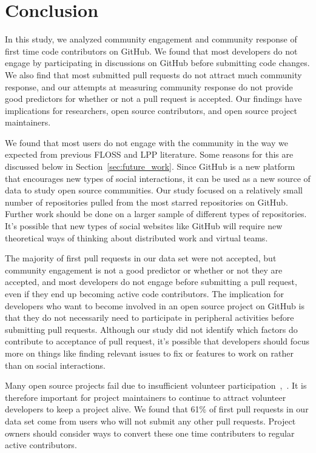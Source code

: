 \documentclass{sigchi}
\begin{document}
\section{Conclusion} \label{chap:conclusion}

In this study, we analyzed community engagement and community response of first
time code contributors on GitHub. We found that most developers do not engage by
participating in discussions on GitHub before submitting code changes. We also
find that most submitted pull requests do not attract much community response,
and our attempts at measuring community response do not provide good predictors
for whether or not a pull request is accepted. Our findings have implications
for researchers, open source contributors, and open source project maintainers.

We found that most users do not engage with the community in the way we expected
from previous FLOSS and LPP literature. Some reasons for this are discussed
below in Section~\ref{sec:future_work}. Since GitHub is a new platform that
encourages new types of social interactions, it can be used as a new source of
data to study open source communities. Our study focused on a relatively small
number of repositories pulled from the most starred repositories on GitHub.
Further work should be done on a larger sample of different types of
repositories. It's possible that new types of social websites like GitHub will
require new theoretical ways of thinking about distributed work and virtual
teams.

The majority of first pull requests in our data set were not accepted, but
community engagement is not a good predictor or whether or not they are
accepted, and most developers do not engage before submitting a pull request,
even if they end up becoming active code contributors. The implication for
developers who want to become involved in an open source project on GitHub is
that they do not necessarily need to participate in peripheral activities before
submitting pull requests. Although our study did not identify which factors do
contribute to acceptance of pull request, it's possible that developers should
focus more on things like finding relevant issues to fix or features to work on
rather than on social interactions.

Many open source projects fail due to insufficient volunteer
participation~\cite{crowston_defining_2003},~\cite{krishnamurthy_cave_2002}. It
is therefore important for project maintainers to continue to attract volunteer
developers to keep a project alive. We found that 61\% of first pull requests
in our data set come from users who will not submit any other pull requests.
Project owners should consider ways to convert these one time contributers to
regular active contributors.
\end{document}
